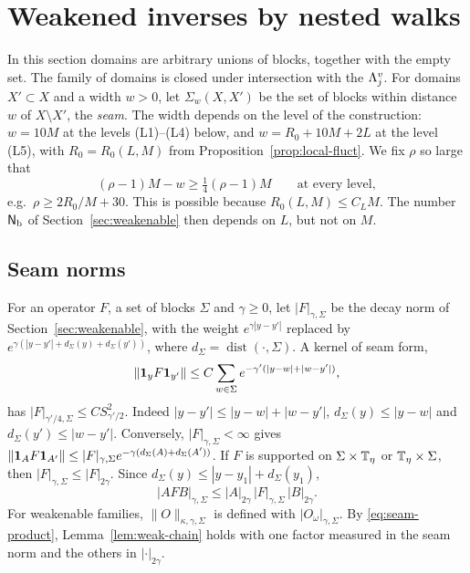 \section{Weakened inverses by nested walks}\label{sec:nested-walks}

In this section domains are arbitrary unions of blocks, together with the empty set. The family of domains is closed under intersection with the $\Lambda^v_j$. For domains $X'\subset X$ and a width $w>0$, let $\Sigma_w(X,X')$ be the set of blocks within distance $w$ of $X\setminus X'$, the \emph{seam}. The width depends on the level of the construction: $w=10M$ at the levels (L1)--(L4) below, and $w=R_0+10M+2L$ at the level (L5), with $R_0=R_0(L,M)$ from Proposition~\ref{prop:local-fluct}. We fix $\rho$ so large that
\begin{equation}\label{eq:rho-choice}
(\rho-1)M-w\ge\tfrac14(\rho-1)M\qquad\text{at every level},
\end{equation}
e.g.\ $\rho\ge2R_0/M+30$. This is possible because $R_0(L,M)\le C_LM$. The number $\mathsf N_{\rm b}$ of Section~\ref{sec:weakenable} then depends on $L$, but not on $M$.

\subsection{Seam norms}

For an operator $F$, a set of blocks $\Sigma$ and $\gamma\ge0$, let $|F|_{\gamma,\Sigma}$ be the decay norm of Section~\ref{sec:weakenable}, with the weight $e^{\gamma|y-y'|}$ replaced by $e^{\gamma(|y-y'|+d_\Sigma(y)+d_\Sigma(y'))}$, where $d_\Sigma=\operatorname{dist}(\cdot,\Sigma)$. A kernel of seam form,
\[
\|\mathbf 1_yF\mathbf 1_{y'}\|\le C\sum_{w\in\Sigma}e^{-\gamma'(|y-w|+|w-y'|)},
\]
has $|F|_{\gamma'/4,\Sigma}\le CS_{\gamma'/2}^2$. Indeed $|y-y'|\le|y-w|+|w-y'|$, $d_\Sigma(y)\le|y-w|$ and $d_\Sigma(y')\le|w-y'|$. Conversely, $|F|_{\gamma,\Sigma}<\infty$ gives $\|\mathbf 1_AF\mathbf 1_{A'}\|\le|F|_{\gamma,\Sigma}e^{-\gamma(d_\Sigma(A)+d_\Sigma(A'))}$. If $F$ is supported on $\Sigma\times\mathbb T_\eta$ or $\mathbb T_\eta\times\Sigma$, then $|F|_{\gamma,\Sigma}\le|F|_{2\gamma}$. Since $d_\Sigma(y)\le|y-y_1|+d_\Sigma(y_1)$,
\begin{equation}\label{eq:seam-product}
|AFB|_{\gamma,\Sigma}\le|A|_{2\gamma}\,|F|_{\gamma,\Sigma}\,|B|_{2\gamma}.
\end{equation}
For weakenable families, $\|O\|_{\kappa,\gamma,\Sigma}$ is defined with $|O_\omega|_{\gamma,\Sigma}$. By \eqref{eq:seam-product}, Lemma~\ref{lem:weak-chain} holds with one factor measured in the seam norm and the others in $|\cdot|_{2\gamma}$.

